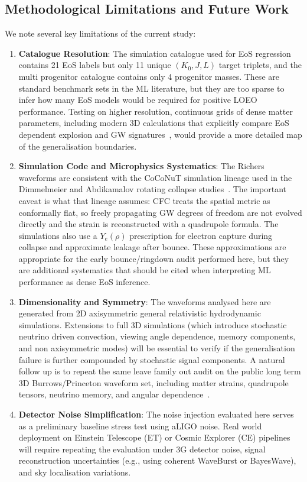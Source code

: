 \documentclass[reprint,aps,prd,floatfix,nofootinbib,superscriptaddress,showpacs]{revtex4-2}
\begin{document}
\subsection{Methodological Limitations and Future Work}
We note several key limitations of the current study:
\begin{enumerate}
    \item \textbf{Catalogue Resolution}: The simulation catalogue used for EoS regression contains 21 EoS labels but only 11 unique $(K_0,J,L)$ target triplets, and the multi progenitor catalogue contains only 4 progenitor masses. These are standard benchmark sets in the ML literature, but they are too sparse to infer how many EoS models would be required for positive LOEO performance. Testing on higher resolution, continuous grids of dense matter parameters, including modern 3D calculations that explicitly compare EoS dependent explosion and GW signatures~\cite{rusakov2026}, would provide a more detailed map of the generalisation boundaries.
    \item \textbf{Simulation Code and Microphysics Systematics}: The Richers waveforms are consistent with the CoCoNuT simulation lineage used in the Dimmelmeier and Abdikamalov rotating collapse studies~\cite{dimmelmeier2002,dimmelmeier2005,abdikamalov2014,richers2017}. The important caveat is what that lineage assumes: CFC treats the spatial metric as conformally flat, so freely propagating GW degrees of freedom are not evolved directly and the strain is reconstructed with a quadrupole formula. The simulations also use a $Y_e(\rho)$ prescription for electron capture during collapse and approximate leakage after bounce. These approximations are appropriate for the early bounce/ringdown audit performed here, but they are additional systematics that should be cited when interpreting ML performance as dense EoS inference.
    \item \textbf{Dimensionality and Symmetry}: The waveforms analysed here are generated from 2D axisymmetric general relativistic hydrodynamic simulations. Extensions to full 3D simulations (which introduce stochastic neutrino driven convection, viewing angle dependence, memory components, and non axisymmetric modes) will be essential to verify if the generalisation failure is further compounded by stochastic signal components. A natural follow up is to repeat the same leave family out audit on the public long term 3D Burrows/Princeton waveform set, including matter strains, quadrupole tensors, neutrino memory, and angular dependence~\cite{vartanyan2023,choi2024,burrowsGWData}.
    \item \textbf{Detector Noise Simplification}: The noise injection evaluated here serves as a preliminary baseline stress test using aLIGO noise. Real world deployment on Einstein Telescope (ET) or Cosmic Explorer (CE) pipelines will require repeating the evaluation under 3G detector noise, signal reconstruction uncertainties (e.g., using coherent WaveBurst or BayesWave), and sky localisation variations.
\end{enumerate}
\end{document}
